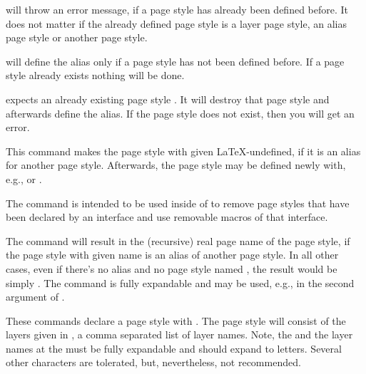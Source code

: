  will throw an error message, if a page style
 has already been defined before. It does not
matter if the already defined page style is a layer page style, an alias page
style or another page style.

 will define the alias only if a page style
 has not been defined before. If a page style
 already exists nothing will be done.

 expects an already existing page style
. It will destroy that page style and afterwards
define the alias. If the page style  does not
exist, then you will get an error.%
\EndIndexGroup


\begin{Declaration}
\end{Declaration}
This command makes the page style with given 
\LaTeX-undefined, if it is an alias for another page style. Afterwards, the
page style may be defined newly with, e.g., 
or . 

The command is intended to be used inside of
 to remove page styles that have been
declared by an interface and use removable macros of that interface.%
\EndIndexGroup


\begin{Declaration}
\end{Declaration}
The command will result in the (recursive) real page name of the page style,
if the page style with given name  is an alias of
another page style. In all other cases, even if there's no alias and no page
style named , the result would be simply . The command is fully expandable and may be used, e.g., in the
second argument of .%
\EndIndexGroup


\begin{Declaration}
\end{Declaration}
These commands declare a page style with . The page
style will consist of the layers given in , a comma
separated list of layer names. Note, the  and the
layer names at the  must be fully expandable and should
expand to letters. Several other characters are tolerated, but,
nevertheless, not recommended.

